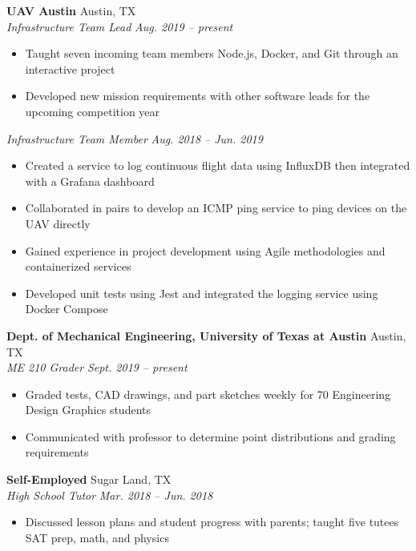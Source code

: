 \documentclass[letterpaper,11pt]{article}
\begin{document}
\textbf{UAV Austin} \hfill Austin, TX\\
\textit{Infrastructure Team Lead} \hfill \textit{Aug. 2019 -- present}\\
\begin{itemize}[noitemsep, topsep=0pt, leftmargin=0.7cm]
  \item Taught seven incoming team members Node.js, Docker, and Git through an interactive project 
  \item Developed new mission requirements with other software leads for the upcoming competition year
\end{itemize}
\textit{Infrastructure Team Member} \hfill \textit{Aug. 2018 -- Jun. 2019}\\
\begin{itemize}[noitemsep, topsep=0pt, leftmargin=0.7cm]
  \item Created a service to log continuous flight data using InfluxDB then integrated with a Grafana dashboard
  \item Collaborated in pairs to develop an ICMP ping service to ping devices on the UAV directly
  \item Gained experience in project development using Agile methodologies and containerized services 
  \item Developed unit tests using Jest and integrated the logging service using Docker Compose
\end{itemize}
\textbf{Dept. of Mechanical Engineering, University of Texas at Austin} \hfill Austin, TX\\
\textit{ME 210 Grader} \hfill \textit{Sept. 2019 -- present}\\
\begin{itemize}[noitemsep, topsep=0pt, leftmargin=0.7cm]
  \item Graded tests, CAD drawings, and part sketches weekly for 70 Engineering Design Graphics students
  \item Communicated with professor to determine point distributions and grading requirements
\end{itemize}
\textbf{Self-Employed} \hfill Sugar Land, TX\\
\textit{High School Tutor} \hfill \textit{Mar. 2018 -- Jun. 2018}\\
\begin{itemize}[noitemsep, topsep=0pt, leftmargin=0.7cm]
  \item Discussed lesson plans and student progress with parents; taught five tutees SAT prep, math, and physics
\end{itemize}
\end{document}
